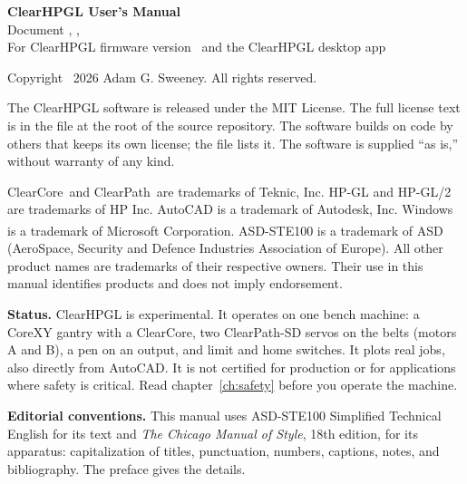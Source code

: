 \newpage
\thispagestyle{empty}
\vspace*{\fill}
{\small\raggedright
\textbf{ClearHPGL User's Manual}\\
Document \docnumber, \docrevision, \docdate\\
For ClearHPGL firmware version \fwversion\ and the ClearHPGL desktop app

\bigskip
Copyright \textcopyright\ 2026 Adam G. Sweeney. All rights reserved.

\medskip
The ClearHPGL software is released under the MIT License. The full license
text is in the file  at the root of the source repository. The
software builds on code by others that keeps its own license; the file
 lists it. The software is supplied ``as
is,'' without warranty of any kind.

\medskip
ClearCore\texttrademark\ and ClearPath\texttrademark\ are trademarks of
Teknic, Inc. HP-GL and HP-GL/2 are trademarks of HP Inc. AutoCAD is a
trademark of Autodesk, Inc. Windows is a trademark of Microsoft Corporation.
ASD-STE100\textsuperscript{\textregistered} is a trademark of ASD
(AeroSpace, Security and Defence Industries Association of Europe). All other
product names are trademarks of their respective owners. Their use in this
manual identifies products and does not imply endorsement.

\medskip
\textbf{Status.} ClearHPGL is experimental. It operates on one bench machine:
a CoreXY gantry with a ClearCore, two ClearPath-SD servos on the belts
(motors A and B), a pen on an output, and limit and home switches. It plots
real jobs, also directly from AutoCAD. It is not certified for
production or for applications where safety is critical. Read
chapter~\ref{ch:safety} before you operate the machine.

\medskip
\textbf{Editorial conventions.} This manual uses ASD-STE100 Simplified
Technical English for its text and \textit{The Chicago Manual of Style},
18th edition, for its apparatus: capitalization of titles, punctuation,
numbers, captions, notes, and bibliography. The preface gives the details.

}
